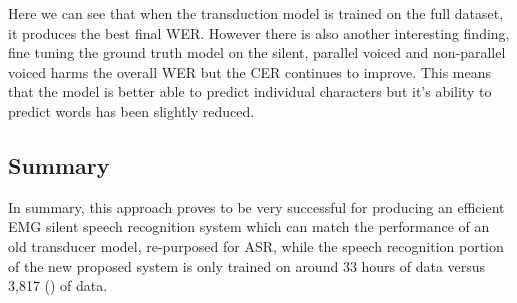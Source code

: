 Here we can see that when the transduction model is trained on the full dataset,
it produces the best final WER. However there is also another interesting finding,
fine tuning the ground truth model on the silent, parallel voiced and non-parallel
voiced harms the overall WER but the CER continues to improve. This means that
the model is better able to predict individual characters but it's ability to
predict words has been slightly reduced.

\subsection{Summary}

In summary, this approach proves to be very successful for producing
an efficient EMG silent speech recognition system which can match the
performance of an old transducer model, re-purposed for ASR, while
the speech recognition portion of the new proposed system is only trained
on around 33 hours of data versus 3,817 (\cite{deepspeech0.7.0-training-ref}) of data.